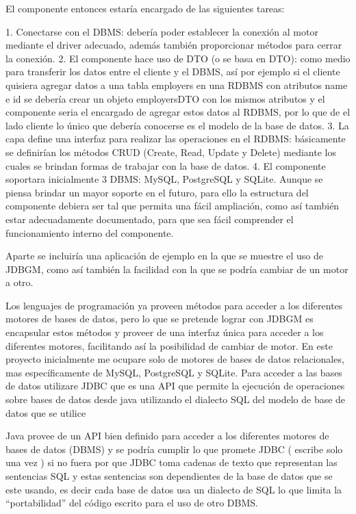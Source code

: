 El componente entonces estaría encargado de las siguientes tareas:

1. Conectarse con el DBMS: debería poder establecer la conexión al motor mediante el driver adecuado, además también proporcionar métodos para cerrar la conexión.
2. El componente hace uso de DTO (o se basa en DTO): como medio para transferir los datos entre el cliente y el DBMS, así por ejemplo si el cliente quisiera agregar datos a una tabla employers en una RDBMS con atributos name e id se debería crear un objeto employersDTO con los mismos atributos y  el componente seria el encargado de agregar estos datos al RDBMS, por lo que de el lado cliente lo único que debería conocerse es el modelo de la base de datos.
3. La capa define una interfaz para realizar las operaciones en el RDBMS: básicamente se definirían los métodos CRUD (Create, Read, Update y Delete) mediante los cuales se brindan formas de trabajar con la base de datos.
4. El componente soportara inicialmente 3 DBMS: MySQL, PostgreSQL y SQLite. Aunque se piensa brindar un mayor soporte en el futuro, para ello la estructura del componente debiera ser tal que permita una fácil ampliación, como así también estar adecuadamente documentado, para que sea fácil comprender el funcionamiento interno del componente.

Aparte se incluiría una aplicación de ejemplo en la que se muestre el uso de JDBGM, como así también la facilidad con la que se podría cambiar de un motor a otro.  


Los lenguajes de programación ya proveen métodos para acceder a los diferentes
motores de bases de datos, pero lo que se pretende lograr con JDBGM es encapsular estos
métodos y proveer de una interfaz única para acceder a los diferentes motores, facilitando
así la posibilidad de cambiar de motor. En este proyecto inicialmente me ocupare solo de
motores de bases de datos relacionales, mas específicamente de MySQL, PostgreSQL y
SQLite. Para acceder a las bases de datos utilizare JDBC que es una API que permite la
ejecución de operaciones sobre bases de datos desde java utilizando el dialecto SQL del
modelo de base de datos que se utilice


Java provee de un API bien definido para acceder a los diferentes motores de
bases de datos (DBMS) y se podría cumplir lo que promete JDBC ( escribe solo una
vez ) si no fuera por que JDBC toma cadenas de texto que representan las sentencias
SQL y estas sentencias son dependientes de la base de datos que se este usando, es
decir cada base de datos usa un dialecto de SQL lo que limita la “portabilidad” del
código escrito para el uso de otro DBMS.
